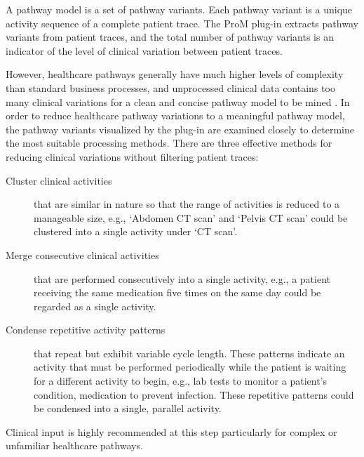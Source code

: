  A pathway model is a set of pathway variants. Each pathway variant is
 a unique activity sequence of a complete patient trace. The ProM
 plug-in  extracts pathway variants from patient traces, and the total number of pathway variants is an indicator of the level of clinical variation between patient traces. 
 
However, healthcare pathways generally have much higher levels of complexity than standard business processes, and unprocessed clinical data contains too many clinical variations for a clean and concise pathway model to be mined \cite{Huang2013, Veiga2010}.
In order to reduce healthcare pathway variations to a meaningful pathway model, the pathway variants visualized by the plug-in  are examined closely to determine the most suitable processing methods. 
There are three effective methods for reducing clinical variations without filtering patient traces:

\begin{description}
    \item[Cluster clinical activities] that are similar in nature so that the range of activities is reduced to a manageable size, e.g., `Abdomen CT scan' and `Pelvis CT scan' could be clustered into a single activity under `CT scan'.
    \item[Merge consecutive clinical activities] that are performed consecutively into a single activity, e.g., a patient receiving the same medication five times on the same day could be regarded as a single activity.
    \item[Condense repetitive activity patterns] 
         that repeat but exhibit variable cycle length. These patterns indicate an activity that must be performed periodically while the patient is waiting for a different activity to begin, e.g., lab tests to monitor a patient’s condition, medication to prevent infection. These repetitive patterns could be condensed into a single, parallel activity.
\end{description}
Clinical input is highly recommended at this step particularly for complex or unfamiliar healthcare pathways. 


